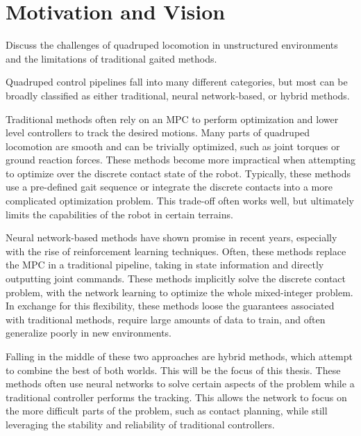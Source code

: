 \section{Motivation and Vision}

\begin{outline}
  Discuss the challenges of quadruped locomotion in unstructured
  environments and the limitations of traditional gaited methods.
\end{outline}

Quadruped control pipelines fall into many different categories, but
most can be broadly classified as either traditional, neural
network-based, or hybrid methods.

Traditional methods often rely on
an MPC to perform optimization and lower level controllers to track the
desired motions. Many parts of quadruped locomotion are smooth
and can be trivially optimized, such as joint torques or ground
reaction forces. These methods become more impractical when
attempting to optimize over the discrete contact state of the robot.
Typically, these methods use a pre-defined gait sequence or integrate
the discrete contacts into a more complicated optimization problem.
This trade-off often works well, but ultimately limits the
capabilities of the robot in certain terrains.

Neural network-based methods have shown promise in recent years,
especially with the rise of reinforcement learning techniques.
Often, these methods replace the MPC in a traditional pipeline,
taking in state information and directly outputting joint commands.
These methods implicitly solve the discrete contact problem, with
the network learning to optimize the whole mixed-integer problem.
In exchange for this flexibility, these methods loose the guarantees
associated with traditional methods, require large amounts of data
to train, and often generalize poorly in new environments.

Falling in the middle of these two approaches are hybrid methods,
which attempt to combine the best of both worlds. This will be the
focus of this thesis. These methods often
use neural networks to solve certain aspects of the problem while
a traditional controller performs the tracking. This allows the network
to focus on the more difficult parts of the problem, such as contact
planning, while still leveraging the stability and reliability of
traditional controllers.
